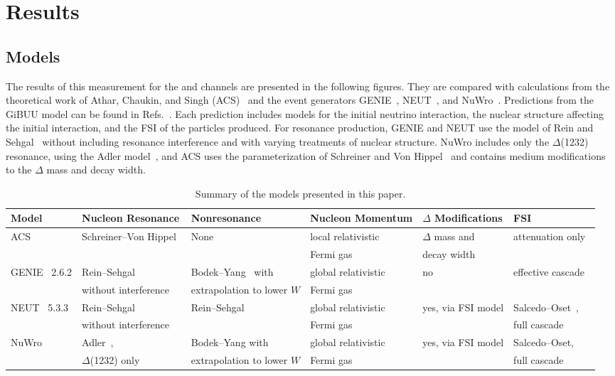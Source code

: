 \section{Results}
\label{sec:results}
\subsection{Models}
The results of this measurement for the \cconepi and \ccpi
channels are presented in the following figures.  They are compared
with calculations from the theoretical work of Athar, Chaukin, and
Singh (ACS)~\cite{Athar} and the event generators GENIE~\cite{Andreopoulos201087}, NEUT~\cite{Hayato:2009zz}, 
and NuWro~\cite{Golan:2012wx}.  Predictions from the GiBUU model can be found in Refs.~\cite{gibuu-minerva, gibuu_mnv}.  Each prediction includes
models for the initial neutrino interaction, the nuclear structure
affecting the initial interaction, and
the FSI of the particles produced.  For resonance production, GENIE and NEUT use
the model of Rein and Sehgal~\cite{Rein:1980wg} without including resonance interference and with varying 
treatments of nuclear structure.  NuWro includes only the $\Delta$(1232) resonance, using the Adler model~\cite{nuwro_res,nuwro_res2}, 
and ACS uses the parameterization of Schreiner and Von Hippel~\cite{acs_res} and contains medium 
modifications to the $\Delta$ mass and decay width.  

\begingroup
\squeezetable
\begin{table}[ht]
\begin{tabular}{l|l|l|l|l|l}
\hline\hline
Model & Nucleon Resonance & Nonresonance & Nucleon Momentum & $\Delta$ Modifications & FSI \\ 
\hline 
ACS~\cite{Athar} & Schreiner--Von Hippel~\cite{acs_res} & None & local relativistic & $\Delta$ mass and & attenuation only~\cite{VicenteVacas:1994} \\ 
    & & & Fermi gas & decay width & \\
\hline
GENIE~\cite{Andreopoulos201087} 2.6.2 & Rein--Sehgal~\cite{Rein:1980wg} & Bodek--Yang~\cite{Bodek:2004pc} with & global relativistic & no & effective cascade \\
    & without interference & extrapolation to lower $W$ & Fermi gas & & \\
\hline
NEUT~\cite{Hayato:2009zz} 5.3.3 & Rein--Sehgal & Rein--Sehgal & global relativistic & yes, via FSI model & Salcedo--Oset~\cite{Salcedo:1987md}, \\
    & without interference & & Fermi gas & & full cascade \\
\hline
NuWro~\cite{Golan:2012wx} & Adler~\cite{nuwro_res,nuwro_res2}, & Bodek--Yang with & global relativistic & yes, via FSI model & Salcedo--Oset, \\
    & $\Delta$(1232) only & extrapolation to lower $W$ & Fermi gas & & full cascade \\

\hline\hline
\end{tabular}
\caption{Summary of the models presented in this paper.}
\label{tab:models}
\end{table}
\endgroup

